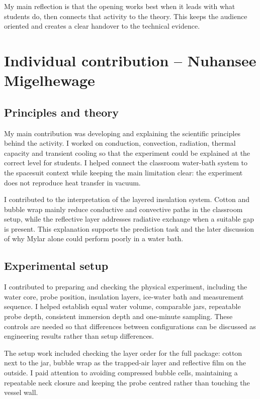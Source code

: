 \documentclass[9pt,a4paper]{extarticle}
\begin{document}
My main reflection is that the opening works best when it leads with what students do, then connects that activity to the theory. This keeps the audience oriented and creates a clear handover to the technical evidence.

\clearpage
\section*{Individual contribution -- Nuhansee Migelhewage}
\subsection*{Principles and theory}
My main contribution was developing and explaining the scientific principles behind the activity. I worked on conduction, convection, radiation, thermal capacity and transient cooling so that the experiment could be explained at the correct level for students. I helped connect the classroom water-bath system to the spacesuit context while keeping the main limitation clear: the experiment does not reproduce heat transfer in vacuum.

I contributed to the interpretation of the layered insulation system. Cotton and bubble wrap mainly reduce conductive and convective paths in the classroom setup, while the reflective layer addresses radiative exchange when a suitable gap is present. This explanation supports the prediction task and the later discussion of why Mylar alone could perform poorly in a water bath.

\subsection*{Experimental setup}
I contributed to preparing and checking the physical experiment, including the water core, probe position, insulation layers, ice-water bath and measurement sequence. I helped establish equal water volume, comparable jars, repeatable probe depth, consistent immersion depth and one-minute sampling. These controls are needed so that differences between configurations can be discussed as engineering results rather than setup differences.

The setup work included checking the layer order for the full package: cotton next to the jar, bubble wrap as the trapped-air layer and reflective film on the outside. I paid attention to avoiding compressed bubble cells, maintaining a repeatable neck closure and keeping the probe centred rather than touching the vessel wall.
\end{document}
